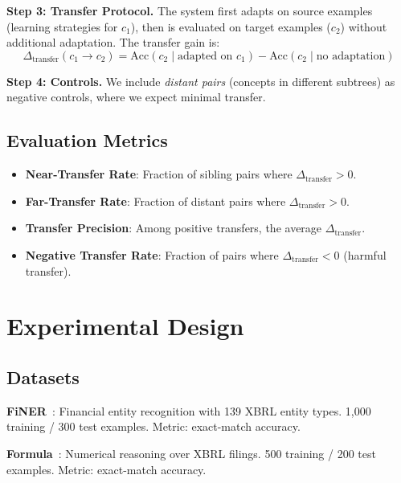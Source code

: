 \documentclass[12pt,a4paper]{article}
\begin{document}
\textbf{Step 3: Transfer Protocol.} The system first adapts on source examples (learning strategies for $c_1$), then is evaluated on target examples ($c_2$) without additional adaptation. The transfer gain is:
\begin{equation}
\Delta_{\text{transfer}}(c_1 \rightarrow c_2) = \text{Acc}(c_2 \mid \text{adapted on } c_1) - \text{Acc}(c_2 \mid \text{no adaptation})
\end{equation}

\textbf{Step 4: Controls.} We include \textit{distant pairs} (concepts in different subtrees) as negative controls, where we expect minimal transfer.

\subsection{Evaluation Metrics}

\begin{itemize}[leftmargin=*]
\item \textbf{Near-Transfer Rate}: Fraction of sibling pairs where $\Delta_{\text{transfer}} > 0$.
\item \textbf{Far-Transfer Rate}: Fraction of distant pairs where $\Delta_{\text{transfer}} > 0$.
\item \textbf{Transfer Precision}: Among positive transfers, the average $\Delta_{\text{transfer}}$.
\item \textbf{Negative Transfer Rate}: Fraction of pairs where $\Delta_{\text{transfer}} < 0$ (harmful transfer).
\end{itemize}


\section{Experimental Design}
\label{sec:experiments}

\subsection{Datasets}

\textbf{FiNER}~\cite{loukas2022finer}: Financial entity recognition with 139 XBRL entity types. 1,000 training / 300 test examples. Metric: exact-match accuracy.

\textbf{Formula}~\cite{wang2025finlora}: Numerical reasoning over XBRL filings. 500 training / 200 test examples. Metric: exact-match accuracy.
\end{document}
